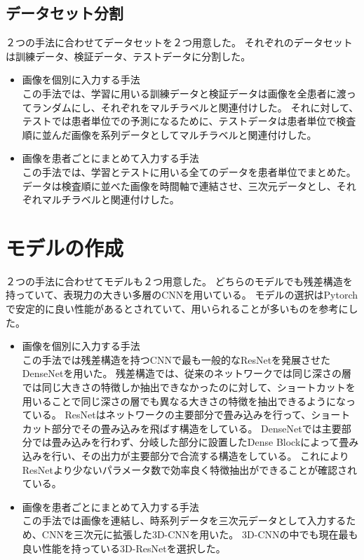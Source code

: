 \subsection{データセット分割}
２つの手法に合わせてデータセットを２つ用意した。
それぞれのデータセットは訓練データ、検証データ、テストデータに分割した。
\begin{itemize}
    \item 画像を個別に入力する手法\\
この手法では、学習に用いる訓練データと検証データは画像を全患者に渡ってランダムにし、それぞれをマルチラベルと関連付けした。
それに対して、テストでは患者単位での予測になるために、テストデータは患者単位で検査順に並んだ画像を系列データとしてマルチラベルと関連付けした。
    \item 画像を患者ごとにまとめて入力する手法\\
この手法では、学習とテストに用いる全てのデータを患者単位でまとめた。
データは検査順に並べた画像を時間軸で連結させ、三次元データとし、それぞれマルチラベルと関連付けした。
\end{itemize}

\section{モデルの作成}
２つの手法に合わせてモデルも２つ用意した。
どちらのモデルでも残差構造を持っていて、表現力の大きい多層のCNNを用いている。
モデルの選択はPytorchで安定的に良い性能があるとされていて、用いられることが多いものを参考にした。
\begin{itemize}
    \item 画像を個別に入力する手法\\
この手法では残差構造を持つCNN\cite{CNN}で最も一般的なResNet\cite{ResNet}を発展させたDenseNet\cite{DenseNet}を用いた。
残差構造では、従来のネットワークでは同じ深さの層では同じ大きさの特徴しか抽出できなかったのに対して、ショートカットを用いることで同じ深さの層でも異なる大きさの特徴を抽出できるようになっている。
ResNet\cite{ResNet}はネットワークの主要部分で畳み込みを行って、ショートカット部分でその畳み込みを飛ばす構造をしている。
DenseNet\cite{DenseNet}では主要部分では畳み込みを行わず、分岐した部分に設置したDense Blockによって畳み込みを行い、その出力が主要部分で合流する構造をしている。
これによりResNet\cite{ResNet}より少ないパラメータ数で効率良く特徴抽出ができることが確認されている。
    \item 画像を患者ごとにまとめて入力する手法\\
この手法では画像を連結し、時系列データを三次元データとして入力するため、CNNを三次元に拡張した3D-CNNを用いた。
3D-CNNの中でも現在最も良い性能を持っている3D-ResNet\cite{3D_ResNet}を選択した。
\end{itemize}

